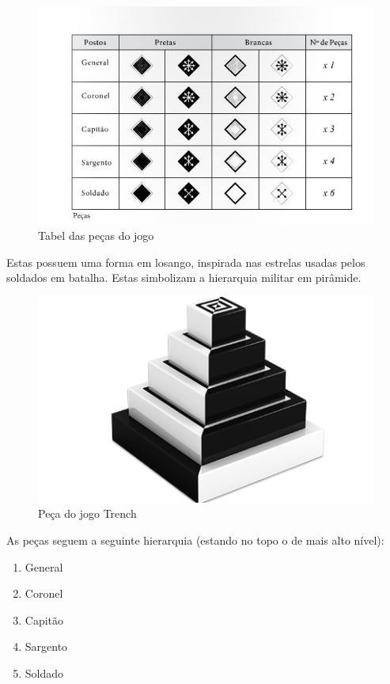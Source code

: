 \documentclass[a4paper]{article}
\begin{document}
\begin{figure}[h!]
\begin{center}
\includegraphics[scale=0.8]{img/pieces.jpg}
\caption{Tabel das peças do jogo}
\label{fig:2}
\end{center}
\end{figure}

 \newpage

Estas possuem uma forma em losango, inspirada nas estrelas usadas pelos soldados em batalha. Estas simbolizam a hierarquia militar em pirâmide.

\begin{figure}[h!]
\begin{center}
\includegraphics[scale=0.5]{img/piece.png}
\caption{Peça do jogo Trench}
\label{fig:3}
\end{center}
\end{figure}

As peças seguem a seguinte hierarquia (estando no topo o de mais alto nível):

\begin{enumerate}
	\item General
	\item Coronel
	\item Capitão
	\item Sargento
	\item Soldado
\end{enumerate}
\end{document}
